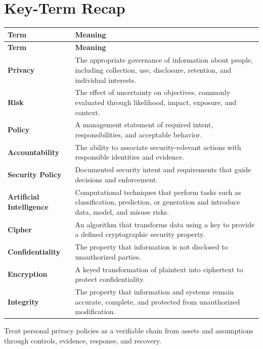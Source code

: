 \documentclass[11pt]{article}
\begin{document}
\section*{Key-Term Recap}
\begin{longtable}{>{\RaggedRight\arraybackslash}p{}>{\RaggedRight\arraybackslash}p{}}
\toprule\rowcolor{Navy}\color{white}\textbf{Term} & \color{white}\textbf{Meaning}\\\midrule
\endfirsthead
\toprule\rowcolor{Navy}\color{white}\textbf{Term} & \color{white}\textbf{Meaning}\\\midrule
\endhead
\textbf{Privacy} & The appropriate governance of information about people, including collection, use, disclosure, retention, and individual interests. \\\midrule
\textbf{Risk} & The effect of uncertainty on objectives, commonly evaluated through likelihood, impact, exposure, and context. \\\midrule
\textbf{Policy} & A management statement of required intent, responsibilities, and acceptable behavior. \\\midrule
\textbf{Accountability} & The ability to associate security-relevant actions with responsible identities and evidence. \\\midrule
\textbf{Security Policy} & Documented security intent and requirements that guide decisions and enforcement. \\\midrule
\textbf{Artificial Intelligence} & Computational techniques that perform tasks such as classification, prediction, or generation and introduce data, model, and misuse risks. \\\midrule
\textbf{Cipher} & An algorithm that transforms data using a key to provide a defined cryptographic security property. \\\midrule
\textbf{Confidentiality} & The property that information is not disclosed to unauthorized parties. \\\midrule
\textbf{Encryption} & A keyed transformation of plaintext into ciphertext to protect confidentiality. \\\midrule
\textbf{Integrity} & The property that information and systems remain accurate, complete, and protected from unauthorized modification. \\\midrule
\bottomrule
\end{longtable}
\begin{takeawaybox}
Treat personal privacy policies as a verifiable chain from assets and assumptions through controls, evidence, response, and recovery.
\end{takeawaybox}
\end{document}
